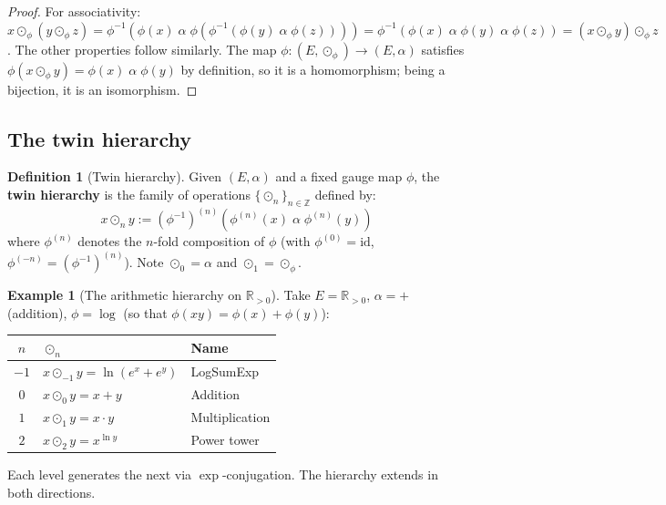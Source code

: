 \documentclass[12pt]{article}
\theoremstyle{plain}
\theoremstyle{definition}
\newtheorem{definition}[theorem]{Definition}
\newtheorem{example}[theorem]{Example}
\theoremstyle{remark}
\newcommand{\RR}{\mathbb{R}}
\newcommand{\ZZ}{\mathbb{Z}}
\begin{document}
\begin{proof}
For associativity: $x \odot_\phi (y \odot_\phi z) = \phi^{-1}(\phi(x) \;\alpha\; \phi(\phi^{-1}(\phi(y) \;\alpha\; \phi(z)))) = \phi^{-1}(\phi(x) \;\alpha\; \phi(y) \;\alpha\; \phi(z)) = (x \odot_\phi y) \odot_\phi z$. The other properties follow similarly. The map $\phi: (E, \odot_\phi) \to (E, \alpha)$ satisfies $\phi(x \odot_\phi y) = \phi(x) \;\alpha\; \phi(y)$ by definition, so it is a homomorphism; being a bijection, it is an isomorphism.
\end{proof}

\subsection{The twin hierarchy}

\begin{definition}[Twin hierarchy]\label{def:hierarchy}
Given $(E, \alpha)$ and a fixed gauge map $\phi$, the \textbf{twin hierarchy} is the family of operations $\{\odot_n\}_{n \in \ZZ}$ defined by:
\begin{equation}
x \odot_n y := (\phi^{-1})^{(n)}(\phi^{(n)}(x) \;\alpha\; \phi^{(n)}(y))
\end{equation}
where $\phi^{(n)}$ denotes the $n$-fold composition of $\phi$ (with $\phi^{(0)} = \mathrm{id}$, $\phi^{(-n)} = (\phi^{-1})^{(n)}$). Note $\odot_0 = \alpha$ and $\odot_1 = \odot_\phi$.
\end{definition}

\begin{example}[The arithmetic hierarchy on $\RR_{>0}$]\label{ex:arithmetic}
Take $E = \RR_{>0}$, $\alpha = +$ (addition), $\phi = \log$ (so that $\phi(xy) = \phi(x) + \phi(y)$):
\begin{center}\small
\begin{tabular}{cll}\toprule
$n$ & $\odot_n$ & \textbf{Name} \\\midrule
$-1$ & $x \odot_{-1} y = \ln(e^x + e^y)$ & LogSumExp \\
$0$ & $x \odot_0 y = x + y$ & Addition \\
$1$ & $x \odot_1 y = x \cdot y$ & Multiplication \\
$2$ & $x \odot_2 y = x^{\ln y}$ & Power tower \\
\bottomrule
\end{tabular}
\end{center}
Each level generates the next via $\exp$-conjugation. The hierarchy extends in both directions.
\end{example}
\end{document}
